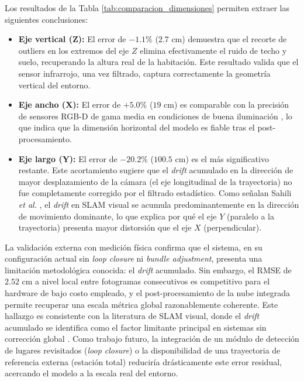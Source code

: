 \documentclass[12pt, a4, twoside, openany]{report}
\begin{document}
Los resultados de la Tabla \ref{tab:comparacion_dimensiones} permiten extraer las siguientes conclusiones:

\begin{itemize}
    \item \textbf{Eje vertical (Z):} El error de $-1.1\%$ ($2.7$ cm) demuestra que el recorte de outliers en los extremos del eje $Z$ elimina efectivamente el ruido de techo y suelo, recuperando la altura real de la habitación. Este resultado valida que el sensor infrarrojo, una vez filtrado, captura correctamente la geometría vertical del entorno.
    \item \textbf{Eje ancho (X):} El error de $+5.0\%$ ($19$ cm) es comparable con la precisión de sensores RGB-D de gama media en condiciones de buena iluminación \cite{6594910}, lo que indica que la dimensión horizontal del modelo es fiable tras el post-procesamiento.
    \item \textbf{Eje largo (Y):} El error de $-20.2\%$ ($100.5$ cm) es el más significativo restante. Este acortamiento sugiere que el \textit{drift} acumulado en la dirección de mayor desplazamiento de la cámara (el eje longitudinal de la trayectoria) no fue completamente corregido por el filtrado estadístico. Como señalan Sahili \textit{et al.} \cite{sahili2023survey}, el \textit{drift} en SLAM visual se acumula predominantemente en la dirección de movimiento dominante, lo que explica por qué el eje $Y$ (paralelo a la trayectoria) presenta mayor distorsión que el eje $X$ (perpendicular).
\end{itemize}

La validación externa con medición física confirma que el sistema, en su configuración actual sin \textit{loop closure} ni \textit{bundle adjustment}, presenta una limitación metodológica conocida: el \textit{drift} acumulado. Sin embargo, el RMSE de $2.52$ cm a nivel local entre fotogramas consecutivos es competitivo para el hardware de bajo costo empleado, y el post-procesamiento de la nube integrada permite recuperar una escala métrica global razonablemente coherente. Este hallazgo es consistente con la literatura de SLAM visual, donde el \textit{drift} acumulado se identifica como el factor limitante principal en sistemas sin corrección global \cite{sahili2023survey}. Como trabajo futuro, la integración de un módulo de detección de lugares revisitados (\textit{loop closure}) o la disponibilidad de una trayectoria de referencia externa (estación total) reduciría drásticamente este error residual, acercando el modelo a la escala real del entorno.
\end{document}
